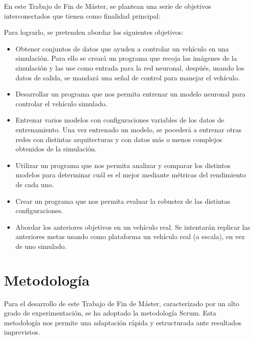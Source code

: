 \documentclass[12pt,a4paper,onecolumn,oneside]{report}
\begin{document}
En este Trabajo de Fin de Máster, se plantean una serie de objetivos interconectados que tienen como finalidad principal:


Para lograrlo, se pretenden abordar los siguientes objetivos: 

\begin{itemize}
    \item[$O_1$]
    Obtener conjuntos de datos  que ayuden a controlar un vehículo en una simulación. Para ello se creará un programa que recoja las imágenes de la simulación y las use como entrada para la red neuronal, despúés, usando los datos de salida, se mandará una señal de control para manejar el vehículo. 
    \item[$O_2$]
    Desarrollar un programa que nos permita entrenar un modelo neuronal para controlar el vehículo simulado. 
    \item[$O_3$] 
    Entrenar varios modelos con configuraciones variables de los datos de entrenamiento. Una vez entrenado un modelo, se pocederá a entrenar otras redes con distintas arquitecturas y con datos más o menos complejos obtenidos de la simulación.
    \item[$O_4$] 
    Utilizar un programa que nos permita analizar y comparar los distintos modelos para determinar cuál es el mejor mediante métricas del rendimiento de cada uno.
    \item[$O_5$] 
    Crear un programa que nos permita evaluar la robustez de las distintas configuraciones.
    \item[$O_6$] 
    Abordar los anteriores objetivos en un vehículo real. Se intentarán replicar las anteriores metas usando como plataforma un vehículo real (a escala), en vez de uno simulado.
\end{itemize}


\section*{Metodología}

Para el desarrollo de este Trabajo de Fin de Máster, caracterizado por un alto grado de experimentación, se ha adoptado la metodología Scrum. Esta metodología nos permite una adaptación rápida y estructurada ante resultados imprevistos.
\end{document}
